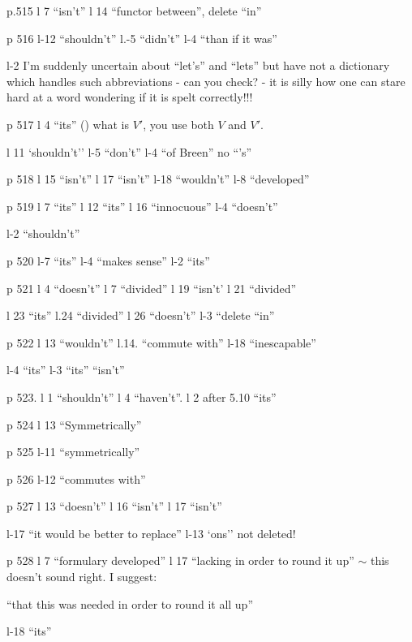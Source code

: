
p.515 l 7 ``isn't'' \quad l 14 ``functor between'', delete ``in''

p 516 l-12 ``shouldn't'' \quad l.-5 ``didn't'' \quad l-4 ``than if it was''

l-2 I'm suddenly uncertain about ``let's'' and ``lets'' but have not a dictionary which handles such abbreviations - can you check? - it is silly how one can stare hard at a  word wondering if it is spelt correctly!!!

p 517 l 4 ``its'' \quad () what is $V'$, you use both $V$ and $V'$.

l 11 `shouldn't'' \quad l-5 ``don't'' \quad l-4 ``of Breen'' no ``'s''

p 518 l 15 ``isn't'' \quad l 17 ``isn't'' \quad l-18 ``wouldn't'' \quad l-8 ``developed''

p 519 l 7 ``its'' \quad l 12 ``its'' \quad l 16 ``innocuous'' \quad l-4 ``doesn't''

l-2 ``shouldn't''

p 520 l-7 ``its'' \quad l-4 ``makes sense'' \quad l-2 ``its''

p 521 l 4 ``doesn't'' \quad l 7 ``divided'' \quad l 19 ``isn't' \quad l 21 ``divided''

l 23 ``its'' \quad l.24 ``divided'' \quad l 26 ``doesn't'' \quad l-3 ``delete ``in''

p 522 l 13 ``wouldn't'' \quad l.14. ``commute with'' \quad l-18 ``inescapable''

l-4 ``its'' \quad l-3 ``its'' ``isn't''

p 523. l 1 ``shouldn't'' \quad l 4 ``haven't''. \quad l 2 after 5.10 ``its''

p 524 l 13 ``Symmetrically''

p 525 l-11 ``symmetrically'' 

p 526 l-12 ``commutes with''

p 527 l 13 ``doesn't'' \quad l 16 ``isn't'' \quad l 17 ``isn't'' \quad {}

l-17 ``it would be better to replace'' \quad l-13 `ons'' not deleted!

p 528 l 7 ``formulary developed'' \quad l 17 ``lacking in order to round it up'' \(\sim\) this doesn't sound right. I suggest:

``that this was needed in order to round it all up''

l-18 ``its''

